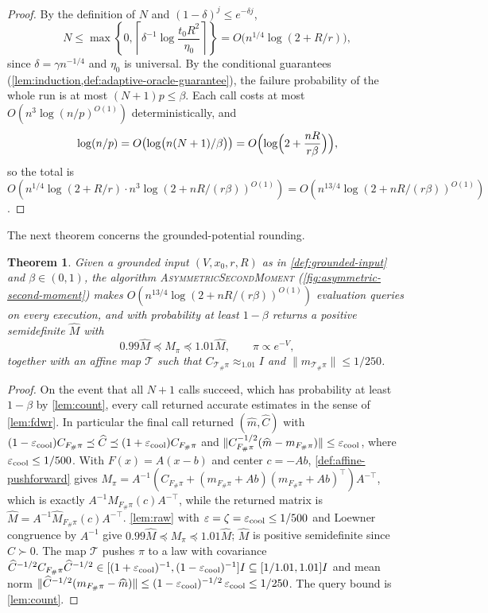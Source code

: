 \documentclass[11pt]{article}
\numberwithin{equation}{section}
\newtheorem{theorem}{Theorem}
\theoremstyle{definition}
\newcommand{\eps}{\varepsilon}
\newcommand{\algname}[1]{\textnormal{\textsc{#1}}}
\begin{document}
\begin{proof}
By the definition of $N$ and $(1-\delta)^j\leq e^{-\delta j}$,
\[
N
\leq\max\left\{0,
\left\lceil\delta^{-1}\log\frac{t_0R^2}{\eta_0}\right\rceil\right\}
=O\bigl(n^{1/4}\log(2+R/r)\bigr),
\]
since $\delta=\gamma n^{-1/4}$ and $\eta_0$ is universal.
By the conditional guarantees
(\cref{lem:induction,def:adaptive-oracle-guarantee}), the failure probability of
the whole run is at most $(N+1)p\leq\beta$.
Each call costs at most $O(n^3\log(n/p)^{O(1)})$ deterministically, and
\[
\log(n/p)
=O\bigl(\log\bigl(n(N+1)/\beta\bigr)\bigr)
=O\Bigl(\log\Bigl(2+\frac{nR}{r\beta}\Bigr)\Bigr),
\]
so the total is
$O(n^{1/4}\log(2+R/r)\cdot n^3\log(2+nR/(r\beta))^{O(1)}) =O(n^{13/4}\log(2+nR/(r\beta))^{O(1)})$.
\end{proof}

The next theorem concerns the grounded-potential rounding.

\begin{theorem}
\label{thm:grounded-rounding}
Given a grounded input $(V,x_0,r,R)$ as in \cref{def:grounded-input} and
$\beta\in(0,1)$, the algorithm
\algname{AsymmetricSecondMoment} (\cref{fig:asymmetric-second-moment})
makes $O(n^{13/4}\log(2+nR/(r\beta))^{O(1)})$ evaluation queries on every
execution, and with probability at least
$1-\beta$ returns a positive semidefinite
$\widehat M$ with
\[
0.99\widehat M
\preceq M_\pi
\preceq1.01\widehat M,
\qquad
\pi\propto e^{-V},
\]
together with an affine map $\mathcal T$ such that
$C_{\mathcal T_\#\pi}\approx_{1.01}I$ and
$\|m_{\mathcal T_\#\pi}\|\leq1/250$.
\end{theorem}

\begin{proof}
On the event that all $N+1$ calls succeed, which has probability at least
$1-\beta$ by \cref{lem:count}, every call returned accurate estimates in the
sense of \cref{lem:fdwr}.
In particular the final call returned $(\widehat m,\widehat C)$ with
$(1-\eps_{\rm cool})C_{F_\#\pi}\preceq\widehat C \preceq(1+\eps_{\rm cool})C_{F_\#\pi}$
and
$\|C_{F_\#\pi}^{-1/2}(\widehat m-m_{F_\#\pi})\|\leq\eps_{\rm cool}$, where
$\eps_{\rm cool}\leq1/500$.
With $F(x)=A(x-b)$ and center
$c=-Ab$, \cref{def:affine-pushforward} gives
$M_\pi=A^{-1}(C_{F_\#\pi}+(m_{F_\#\pi}+Ab)(m_{F_\#\pi}+Ab)^\top )A^{-\top}$,
which is exactly
$A^{-1}M_{F_\#\pi}(c)A^{-\top}$, while the returned matrix is
$\widehat M=A^{-1}\widehat M_{F_\#\pi}(c)A^{-\top}$.
\cref{lem:raw} with $\eps=\zeta=\eps_{\rm cool}\leq1/500$ and Loewner congruence
by
$A^{-1}$ give
$0.99\widehat M\preceq M_\pi\preceq1.01\widehat M$;
$\widehat M$ is positive semidefinite since
$\widehat C\succ0$.
The map $\mathcal T$ pushes
$\pi$ to a law with covariance
$\widehat C^{-1/2}C_{F_\#\pi}\widehat C^{-1/2} \in[(1+\eps_{\rm cool})^{-1},(1-\eps_{\rm cool})^{-1}]I \subseteq[1/1.01,1.01]I$
and mean norm
$\|\widehat C^{-1/2}(m_{F_\#\pi}-\widehat m)\| \leq(1-\eps_{\rm cool})^{-1/2}\,\eps_{\rm cool}\leq1/250$.
The query bound is \cref{lem:count}.
\end{proof}
\end{document}
